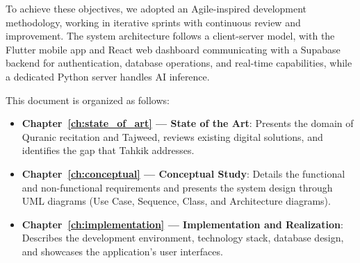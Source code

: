To achieve these objectives, we adopted an Agile-inspired development methodology, working in iterative sprints with continuous review and improvement. The system architecture follows a client-server model, with the Flutter mobile app and React web dashboard communicating with a Supabase backend for authentication, database operations, and real-time capabilities, while a dedicated Python server handles AI inference.

This document is organized as follows:

\begin{itemize}
  \item \textbf{Chapter~\ref{ch:state_of_art} --- State of the Art}: Presents the domain of Quranic recitation and Tajweed, reviews existing digital solutions, and identifies the gap that Tahkik addresses.
  \item \textbf{Chapter~\ref{ch:conceptual} --- Conceptual Study}: Details the functional and non-functional requirements and presents the system design through UML diagrams (Use Case, Sequence, Class, and Architecture diagrams).
  \item \textbf{Chapter~\ref{ch:implementation} --- Implementation and Realization}: Describes the development environment, technology stack, database design, and showcases the application's user interfaces.
\end{itemize}

